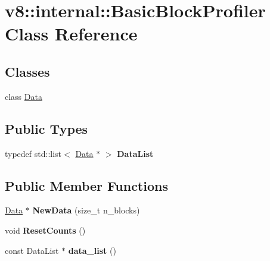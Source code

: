 \hypertarget{classv8_1_1internal_1_1_basic_block_profiler}{}\section{v8\+:\+:internal\+:\+:Basic\+Block\+Profiler Class Reference}
\label{classv8_1_1internal_1_1_basic_block_profiler}
\subsection*{Classes}
\begin{DoxyCompactItemize}
\item 
class \hyperlink{classv8_1_1internal_1_1_basic_block_profiler_1_1_data}{Data}
\end{DoxyCompactItemize}
\subsection*{Public Types}
\begin{DoxyCompactItemize}
\item 
typedef std\+::list$<$ \hyperlink{classv8_1_1internal_1_1_basic_block_profiler_1_1_data}{Data} $\ast$ $>$ {\bfseries Data\+List}\hypertarget{classv8_1_1internal_1_1_basic_block_profiler_a7f5f96a6ba2122badb89714b849be9c7}{}\label{classv8_1_1internal_1_1_basic_block_profiler_a7f5f96a6ba2122badb89714b849be9c7}

\end{DoxyCompactItemize}
\subsection*{Public Member Functions}
\begin{DoxyCompactItemize}
\item 
\hyperlink{classv8_1_1internal_1_1_basic_block_profiler_1_1_data}{Data} $\ast$ {\bfseries New\+Data} (size\+\_\+t n\+\_\+blocks)\hypertarget{classv8_1_1internal_1_1_basic_block_profiler_a538de5904fafeabe2ec71ad9a75e62ba}{}\label{classv8_1_1internal_1_1_basic_block_profiler_a538de5904fafeabe2ec71ad9a75e62ba}

\item 
void {\bfseries Reset\+Counts} ()\hypertarget{classv8_1_1internal_1_1_basic_block_profiler_a0b1489c4a45d1f51e7bc38b74eb1c974}{}\label{classv8_1_1internal_1_1_basic_block_profiler_a0b1489c4a45d1f51e7bc38b74eb1c974}

\item 
const Data\+List $\ast$ {\bfseries data\+\_\+list} ()\hypertarget{classv8_1_1internal_1_1_basic_block_profiler_a2dfa3d982dfbaba87e278816f66e06bf}{}\label{classv8_1_1internal_1_1_basic_block_profiler_a2dfa3d982dfbaba87e278816f66e06bf}

\end{DoxyCompactItemize}
